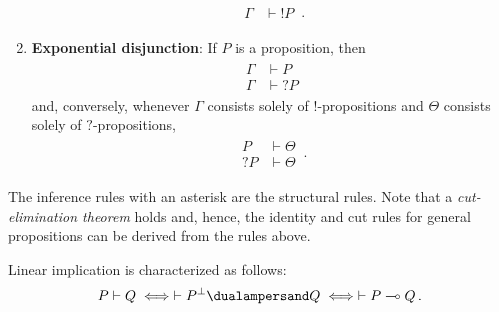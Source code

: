 \begin{enumerate}
\begin{gather}
\begin{aligned}
                    \Gamma&\vdash!P
                \end{aligned}\,.
            \end{gather}
        \item\textbf{Exponential disjunction}: If $P$ is a proposition, then
            \begin{gather}
                \begin{aligned}
                    \Gamma&\vdash P\\
                    \hline
                    \Gamma&\vdash?P
                \end{aligned}
            \end{gather}
            and, conversely, whenever $\Gamma$ consists solely of $!$-propositions and $\Theta$ consists solely of $?$-propositions,
            \begin{gather}
                \begin{aligned}
                    P&\vdash\Theta\\
                    \hline
                    ?P&\vdash\Theta
                \end{aligned}\,.
            \end{gather}
    \end{enumerate}
    The inference rules with an asterisk are the structural rules. Note that a \textit{cut-elimination theorem} holds and, hence, the identity and cut rules for general propositions can be derived from the rules above.

    Linear implication is characterized as follows:
    \begin{gather}
        P\vdash Q \iff \vdash P^\perp\dualampersand Q \iff \vdash P\multimap Q\,.
    \end{gather}

